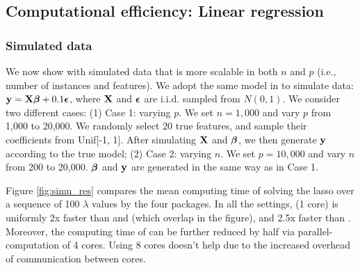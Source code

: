 \subsection{Computational efficiency: Linear regression}

\subsubsection{Simulated data}

We now show with simulated data that  is more scalable in both $n$ and $p$ (i.e., number of instances and features). We adopt the same model in \cite{JMLR:v16:wang15a} to simulate data: $\mathbf{y} = \mathbf{X} \boldsymbol{\beta} + 0.1 \boldsymbol{\epsilon}$, where $\mathbf{X}$ and $\boldsymbol{\epsilon}$ are i.i.d. sampled from $N(0, 1)$. We consider two different cases: (1) Case 1: varying $p$. We set $n=1,000$ and vary $p$ from 1,000 to 20,000. We randomly select 20 true features, and sample their coefficients from Unif[-1, 1]. After simulating $\mathbf{X}$ and $\boldsymbol{\beta}$, we then generate $\mathbf{y}$ according to the true model; (2) Case 2: varying $n$. We set $p=10,000$ and vary $n$ from 200 to 20,000. $\boldsymbol{\beta}$ and $\mathbf{y}$ are generated in the same way as in Case 1.

Figure \ref{fig:simu_res} compares the mean computing time of solving the lasso over a sequence of 100 $\lambda$ values by the four packages. In all the settings,  (1 core) is uniformly 2x faster than  and  (which overlap in the figure), and 2.5x faster than . Moreover, the computing time of  can be further reduced by half via parallel-computation of 4 cores. Using 8 cores doesn't help due to the increased overhead of communication between cores.

%


